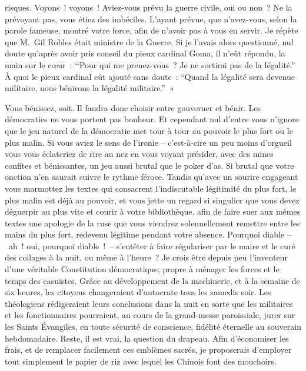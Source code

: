 \documentclass[french,twoside]{book} %
\newcommand{\astertri}{\medskip\par\centerline{\color{rubric}\large\selectfont{\syms ✻\,✻\,✻}}\medskip\par}%
\begin{document}
risques. Voyons ! voyons ! Aviez-vous prévu la guerre civile, oui ou non ? Ne la prévoyant pas, vous étiez des imbéciles. L’ayant prévue, que n’avez-vous, selon la parole fameuse, montré votre force, afin de n’avoir pas à vous en servir. Je répète que M. Gil Robles était ministre de la Guerre. Si je l’avais alors questionné, nul doute qu’après avoir pris conseil du pieux cardinal Goma, il n’eût répondu, la main sur le cœur : ‘‘Pour qui me prenez-vous ? Je ne sortirai pas de la légalité.” À quoi le pieux cardinal eût ajouté sans doute : “Quand la légalité sera devenue militaire, nous bénirons la légalité militaire.” »\par

\astertri

\noindent Vous bénissez, soit. Il faudra donc choisir entre gouverner et bénir. Les démocraties ne vous portent pas bonheur. Et cependant nul d’entre vous n’ignore que le jeu naturel de la démocratie met tour à tour au pouvoir le plus fort ou le plus malin. Si vous aviez le sens de l’ironie – c’est-à-cire un peu moins d’orgueil vous vous éclateriez de rire au nez en vous voyant présider, avec des mines confites et bénissantes, un jeu aussi brutal que le poker d’as. Si brutal que votre onction n’en saurait suivre le rythme féroce. Tandis qu’avec un sourire engageant vous marmottez les textes qui consacrent l’indiscutable légitimité du plus fort, le plus malin est déjà au pouvoir, et vous jette un regard si singulier que vous devez déguerpir au plus vite et courir à votre bibliothèque, afin de faire suer aux mêmes textes une apologie de la ruse que vous viendrez solennellement remettre entre les mains du plus fort, redevenu légitime pendant votre absence. Pourquoi diable – ah ! oui, pourquoi diable ! – s’entêter à faire régulariser par le maire et le curé des collages à la nuit, ou même à l’heure ? Je crois être depuis peu l’inventeur d’une véritable Constitution démocratique, propre à ménager les forces et le temps des casuistes. Grâce au développement de la machinerie, et à la semaine de six heures, les citoyens changeraient d’autocrate tous les samedis soir. Les théologiens rédigeraient leurs conclusions dans la nuit en sorte que les militaires et les fonctionnaires pourraient, au cours de la grand-messe paroissiale, jurer sur les Saints Évangiles, en toute sécurité de conscience, fidélité éternelle au souverain hebdomadaire. Reste, il est vrai, la question du drapeau. Afin d’économiser les frais, et de remplacer facilement ces emblèmes sacrés, je proposerais d’employer tout simplement le papier de riz avec lequel les Chinois font des mouchoirs.\par
\end{document}
